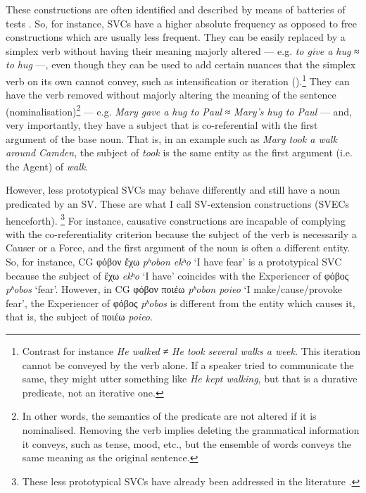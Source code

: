 \documentclass[output=paper,colorlinks,citecolor=brown]{langscibook}
\begin{document}
These constructions are often identified and described by means of batteries of tests
\parencites{langer_linguistic_2004,jimenez_lopez_support_2016}. So, for instance, SVCs
have a higher absolute frequency as opposed to free constructions which are usually
less frequent. They can be easily replaced by a simplex verb without having their meaning
majorly altered --- e.g. \emph{to give a hug} ≈ \emph{to hug} ---, even though they can be
used to add certain nuances that the simplex verb on its own cannot convey, such as
intensification or iteration (\cite{jimenez_lopez_support_2016}).\footnote{Contrast for
  instance \emph{He walked} ≠ \emph{He took several walks a week.} This iteration cannot
  be conveyed by the verb alone. If a speaker tried to communicate the same, they might
  utter something like \emph{He kept walking}, but that is a durative predicate, not an
  iterative one.} They can have the verb removed without majorly altering the meaning of
the sentence (nominalisation)\footnote{In other words, the semantics of the predicate are
  not altered if it is nominalised. Removing the verb implies deleting the grammatical
  information it conveys, such as tense, mood, etc., but the ensemble of words conveys the
  same meaning as the original sentence.} --- e.g. \emph{Mary gave a hug to Paul} ≈
\emph{Mary's hug to Paul} --- and, very importantly, they have a subject that is
co-referential with the first argument of the base noun. That is, in an example such as
\emph{Mary took a walk around Camden}, the subject of \emph{took} is the same entity as
the first argument (i.e. the Agent) of \emph{walk}.

However, less prototypical SVCs may behave differently and still have a noun predicated by
an SV. These are what I call SV-extension constructions (SVECs henceforth). \footnote{These
  less prototypical SVCs have already been addressed in the literature
  \parencites{anscombre_morphologie_1995,gross_predicats_1996,gross_pour_2004,gross_fonction_1998,banos_consilium_2014}.}
For instance, causative constructions are incapable of complying with the
co-referentiality criterion because the subject of the verb is necessarily a Causer or a
Force, and the first argument of the noun is often a different entity. So, for instance,
CG φόβον ἔχω \emph{pʰobon ekʰo} `I have fear' is a
prototypical SVC because the subject of ἔχω \emph{ekʰo} `I have'
coincides with the Experiencer of φόβος \emph{pʰobos} `fear'. However,
in CG φόβον ποιέω \emph{pʰobon poieo} `I make/cause/provoke fear', the
Experiencer of φόβος \emph{pʰobos} is different from the entity which
causes it, that is, the subject of ποιέω \emph{poieo}.
\end{document}
